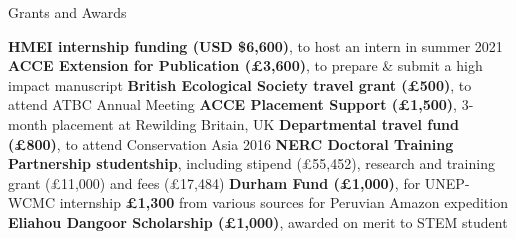 \begin{rubric}{Grants and Awards}

\entry*[2021] \textbf{HMEI internship funding (USD \$6,600)}, to host an intern in summer 2021
\entry*[2018] \textbf{ACCE Extension for Publication (£3,600)}, to prepare \& submit a high impact manuscript
\entry*[2018] \textbf{British Ecological Society travel grant (£500)}, to attend ATBC Annual Meeting
\entry*[2016] \textbf{ACCE Placement Support (£1,500)}, 3-month placement at Rewilding Britain, UK
\entry*[2016] \textbf{Departmental travel fund (£800)}, to attend Conservation Asia 2016
\entry*[2014] \textbf{NERC Doctoral Training Partnership studentship}, including stipend (£55,452), research and training grant (£11,000) and fees (£17,484)
\entry*[2013] \textbf{Durham Fund (£1,000)}, for UNEP-WCMC internship
\entry*[2011] \textbf{£1,300} from various sources for Peruvian Amazon expedition
\entry*[2010] \textbf{Eliahou Dangoor Scholarship (£1,000)}, awarded on merit to STEM student
\end{rubric}